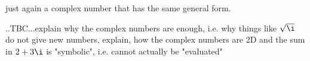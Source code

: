 just again a complex number that has the same general form.


..TBC...explain why the complex numbers are enough, i.e. why things like $\sqrt{\i}$ do not give new numbers, explain, how the complex numbers are 2D and the sum in $2 + 3 \i$ is "symbolic", i.e. cannot actually be "evaluated"


